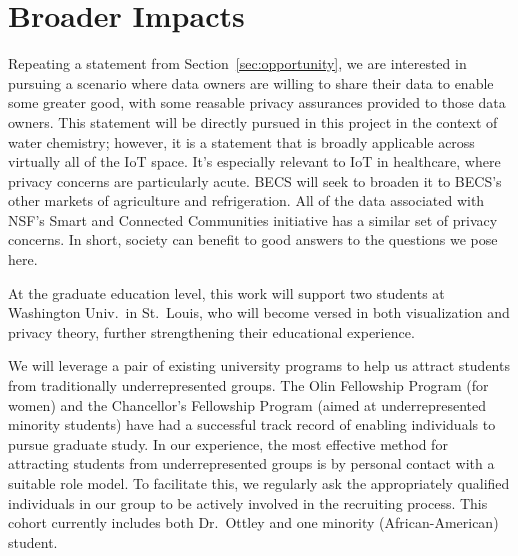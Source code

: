 \section{Broader Impacts}
\label{sec:broader}

Repeating a statement from Section~\ref{sec:opportunity},
we are interested in pursuing a scenario
where data owners are willing to share their data to enable some greater
good, with some reasable privacy assurances provided to those data owners.
This statement will be directly pursued in this project in the context of water
chemistry; however, it is a statement that is broadly applicable
across virtually all of the IoT space.
It's especially relevant to IoT in healthcare, where privacy concerns
are particularly acute.
BECS will seek to broaden it to BECS's other markets of agriculture
and refrigeration.
All of the data associated with NSF's Smart and Connected Communities
initiative has a similar set of privacy concerns.
In short, society can benefit to good answers to the questions we pose here.

At the graduate education level, this work will support two 
students at Washington Univ.~in St.~Louis, who
will become versed in both visualization and
privacy theory, further strengthening their educational experience.

We will leverage a pair of existing university programs to help us
attract students from traditionally underrepresented groups.  The Olin
Fellowship Program (for women) and the Chancellor's Fellowship Program
(aimed at underrepresented minority students) have had a successful track
record of enabling individuals to pursue graduate study.  In our
experience, the most effective method for attracting students from
underrepresented groups is by personal contact with a suitable role
model.  To facilitate this, we regularly ask the appropriately
qualified individuals in our group to be actively involved in the
recruiting process.  This cohort currently includes both Dr.~Ottley
and one minority (African-American) student.
